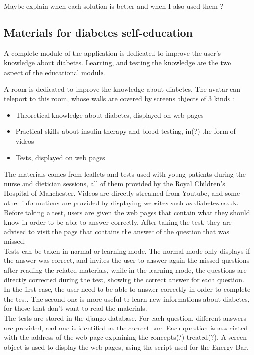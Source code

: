 Maybe explain when each solution is better and when I also used them ?

\subsection{Materials for diabetes self-education}
A complete module of the application is dedicated to improve the user's knowledge about diabetes. Learning, and testing the knowledge are the two aspect of the educational module.

A room is dedicated to improve the knowledge about diabetes. The avatar can teleport to this room, whose walls are covered by screens objects of 3 kinds :
\begin{itemize}
\item Theoretical knowledge about diabetes, displayed on web pages
\item Practical skills about insulin therapy and blood testing, in(?) the form of videos
\item Tests, displayed on web pages
\end{itemize}

The materials comes from leaflets and tests used with young patients during the nurse and dietician sessions, all of them provided by the Royal Children's Hospital of Manchester. Videos are directly streamed from Youtube, and some other informations are provided by displaying websites such as diabetes.co.uk.\\

Before taking a test, users are given the web pages that contain what they should know in order to be able to answer correctly. After taking the test, they are advised to visit the page that contains the answer of the question that was missed.\\
Tests can be taken in normal or learning mode. The normal mode only displays if the answer was correct, and invites the user to answer again the missed questions after reading the related materials, while in the learning mode, the questions are directly corrected during the test, showing the correct answer for each question. 
In the first case, the user need to be able to answer correctly in order to complete the test. The second one is more useful to learn new informations about diabetes, for those that don't want to read the materials.\\

The tests are stored in the django database. For each question, different answers are provided, and one is identified as the correct one. Each question is associated with the address of the web page explaining the concepts(?) treated(?). %
A screen object is used to display the web pages, using the script used for the Energy Bar.